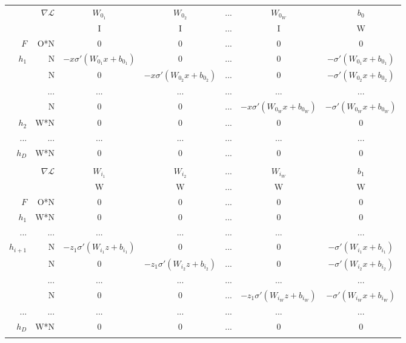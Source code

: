 \newpage
\begin{adjustwidth}{2000pt}{2000pt}
\begin{table}
\tiny
\centering
\begin{tabular}{r r | c c c c c}\hline

& $\nabla\mathcal{L}$ & $W_{0_1}$ & $W_{0_2}$ & ... & $W_{0_W}$ & $b_0$ \\
& & I & I &...& I & W \\ \hline
$F$ & O*N & 0 & 0 &...& 0 & 0\\ \hline
$h_1$ & N & 		$-x\sigma'(W_{0_1}x+b_{0_1})$ & 0 &...& 0 & $-\sigma'(W_{0_1}x+b_{0_1})$ \\
      & N & 0 & 	$-x\sigma'(W_{0_2}x+b_{0_2})$ &...& 0 &  	$-\sigma'(W_{0_2}x+b_{0_2})$ \\
      &...&...&...&...&...&... \\
      & N & 0 & 0 &...& $-x\sigma'(W_{0_W}x+b_{0_W})$ &  		$-\sigma'(W_{0_W}x+b_{0_W})$ \\ \hline
$h_2$ & W*N & 0 & 0 &...& 0 & 0 \\
...   & ... &...&...&...&...&...\\ 
$h_{D}$ & W*N & 0 & 0 &...& 0 & 0 \\ \hline \\ \hline

& $\nabla\mathcal{L}$ & $W_{i_1}$ & $W_{i_2}$ &...& $W_{i_W}$ & $b_1$ \\
& & W & W &...& W & W \\ \hline
$F$ & O*N & 0 & 0 &...& 0 & 0 \\ \hline
$h_1$ & W*N & 0 & 0 &...& 0 & 0 \\
...   & ... &...&...&...&...&...\\ \hline
$h_{i+1}$ & N & 		$-z_1\sigma'(W_{i_1}z + b_{i_1})$ & 0 &...& 0 & $-\sigma'(W_{i_1}x+b_{i_1})$ \\
      & N & 0 & 	$-z_1\sigma'(W_{i_2}z + b_{i_2})$ &...& 0 & 	$-\sigma'(W_{i_2}x+b_{i_2})$ \\
      &...&...&...&...&...&... \\
      & N & 0 & 0 &...& $-z_1\sigma'(W_{i_W}z + b_{i_W})$ & 		$-\sigma'(W_{i_W}x+b_{i_W})$ \\ \hline
...   & ... &...&...&...&...&...\\ 
$h_{D}$ & W*N & 0 & 0 &...& 0 & 0 \\ \hline \\ \hline


\end{tabular}
\end{table}
\end{adjustwidth}
